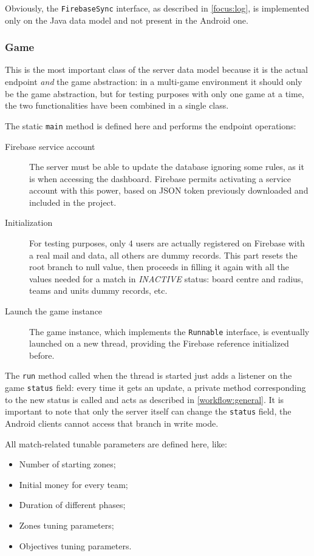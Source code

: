 			Obviously, the \lstinline|FirebaseSync| interface, as described in \autoref{focus:log}, is implemented only on the Java data model and not present in the Android one.
			
			\subsubsection{Game}
		
				This is the most important class of the server data model because it is the actual endpoint \emph{and} the game abstraction: in a multi-game environment it should only be the game abstraction, but for testing purposes with only one game at a time, the two functionalities have been combined in a single class.
				
				The static \lstinline|main| method is defined here and performs the endpoint operations:
				\begin{description}
					\item[Firebase service account] The server must be able to update the database ignoring some rules, as it is when accessing the dashboard. Firebase permits activating a service account with this power, based on JSON token previously downloaded and included in the project.
					\item[Initialization] For testing purposes, only 4 users are actually registered on Firebase with a real mail and data, all others are dummy records. This part resets the root branch to null value, then proceeds in filling it again with all the values needed for a match in \emph{INACTIVE} status: board centre and radius, teams and units dummy records, etc.
					\item[Launch the game instance] The game instance, which implements the \lstinline|Runnable| interface, is eventually launched on a new thread, providing the Firebase reference initialized before.
				\end{description}
				
				The \lstinline|run| method called when the thread is started just adds a listener on the game \lstinline|status| field: every time it gets an update, a private method corresponding to the new status is called and acts as described in \autoref{workflow:general}.
				It is important to note that only the server itself can change the \lstinline|status| field, the Android clients cannot access that branch in write mode.
				
				All match-related tunable parameters are defined here, like:
				\begin{itemize}
					\item Number of starting zones;
					\item Initial money for every team;
					\item Duration of different phases;
					\item Zones tuning parameters;
					\item Objectives tuning parameters.
				\end{itemize}
			
